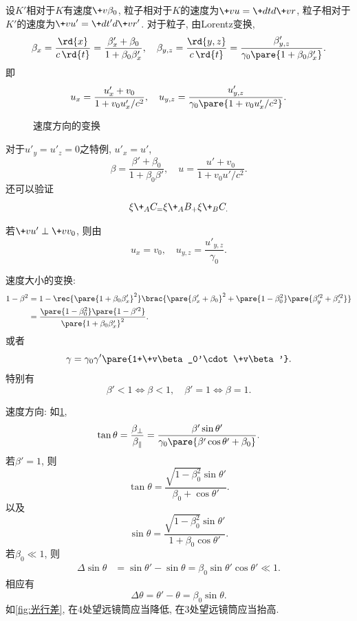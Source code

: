 \documentclass[hidelinks]{ctexart}
\begin{document}
设$K'$相对于$K$有速度$\+v\beta_0$, 粒子相对于$K$的速度为$\displaystyle \+vu = \+dtd{\+vr}$, 粒子相对于$K'$的速度为$\displaystyle \+vu' = \+d{t'}d{\+vr'}$. 对于粒子, 由Lorentz变换,
\[ \beta_x = \frac{\rd{x}}{c\,\rd{t}} = \frac{\beta'_x + \beta_0}{1+\beta_0 \beta_x'}, \quad \beta_{y,z} = \frac{\rd{y,z}}{c\,\rd{t}} = \frac{\beta'_{y,z}}{\gamma_0 \pare{1+\beta_0\beta'_x}}. \]
即
\[ u_x = \frac{u'_x+v_0}{1+v_0u'_x/c^2},\quad u_{y,z} = \frac{u'_{y,z}}{\gamma_0 \pare{1+v_0u'_x/c^2}}. \]
\begin{figure}[ht]
    \centering
    \caption{速度方向的变换}
    \label{fig:速度方向的变换}
\end{figure}
\begin{cenum}
    \item 对于$u'_y = u'_z = 0$之特例, $u'_x = u'$,
    \[ \beta = \frac{\beta' + \beta_0}{1+\beta_0\beta'},\quad u = \frac{u' + v_0}{1+v_0u' /c^2}. \]
    还可以验证
    \[ \xi\+_AC_ = \xi\+_AB_ + \xi\+_BC_. \]
    \item 若$\+vu'\perp \+vv_0$, 则由
    \[ u_x = v_0,\quad u_{y,z} = \frac{u'_{y,z}}{\gamma_0}. \]
    \item 速度大小的变换:
    \begin{align*}
        1-\beta^2 &= 1 - \rec{\pare{1+\beta_0\beta'_x}^2}\brac{\pare{\beta'_x + \beta_0}^2 + \pare{1-\beta_0^2}\pare{\beta'^2_y + \beta'^2_z}} \\
        &= \frac{\pare{1-\beta_0^2}\pare{1-\beta'^2}}{\pare{1+\beta_0\beta'_x}^2}.
    \end{align*}
    或者
    \[ \gamma = \gamma_0 \gamma' \pare{1+\+v\beta_0'\cdot \+v\beta'}. \]
    特别有
    \[ \beta'< 1 \Leftrightarrow \beta<1,\quad \beta' = 1 \Leftrightarrow \beta = 1. \]
    \item 速度方向: 如\cref{fig:速度方向的变换},
    \[ \tan\theta = \frac{\beta_\perp}{\beta_\parallel} = \frac{\beta'\sin\theta'}{\gamma_0\pare{\beta'\cos\theta' + \beta_0}}. \]
    若$\beta' = 1$, 则
    \[ \tan\theta = \frac{\sqrt{1-\beta_0^2}\sin\theta'}{\beta_0 + \cos\theta'}. \]
    以及
    \[ \sin\theta = \frac{\sqrt{1-\beta_0^2}\sin\theta'}{1+\beta_0\cos\theta'}. \]
    若$\beta_0 \ll 1$, 则
    \begin{align*}
        \Delta \sin\theta &= \sin\theta' - \sin\theta = \beta_0 \sin\theta' \cos\theta' \ll 1.
    \end{align*}
    相应有
    \[ \Delta\theta = \theta' - \theta = \beta_0 \sin\theta. \]
    如\cref{fig:光行差}, 在$4$处望远镜筒应当降低, 在$3$处望远镜筒应当抬高.

\end{cenum}
\end{document}

